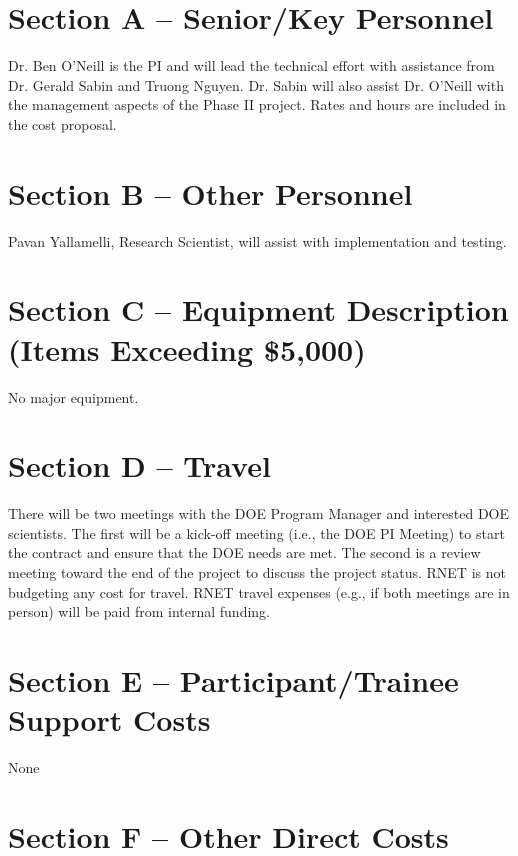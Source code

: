 

\section{Section A -- Senior/Key Personnel}
Dr. Ben O'Neill is the PI and will lead the technical effort with
assistance from Dr. Gerald Sabin and Truong Nguyen. Dr. Sabin will also assist Dr. O'Neill with the management aspects of the Phase II project. Rates and hours are included in the cost proposal. 

\section{Section B -- Other Personnel}
Pavan Yallamelli, Research Scientist, will assist with implementation and testing. 

\section{Section C -- Equipment Description (Items Exceeding \$5,000)}
No major equipment.

\section{Section D -- Travel}
There will be two meetings with the DOE Program Manager and interested
DOE scientists. The first will be a kick-off meeting (i.e., the DOE PI
Meeting) to start the contract and ensure that the DOE needs are
met. The second is a review meeting toward the end of the project to
discuss the project status.  RNET is not budgeting any cost for
travel. RNET travel expenses (e.g., if both meetings
are in person) will be paid from internal funding.

\section{Section E -- Participant/Trainee Support Costs}
None
  
  
\section{Section F -- Other Direct Costs}
